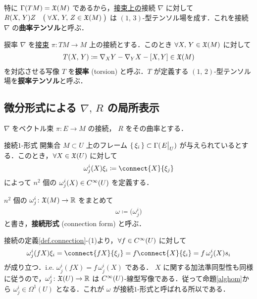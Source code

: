 \documentclass[geometry_main]{subfiles}
\begin{document}
\begin{marker} 
	特に $\Gamma(TM) = \mathfrak{X}(M)$ であるから，\underline{接束上の}接続 $\nabla$ に対して $R(X,\, Y) Z \quad \bigl(\; \forall X,\, Y,\, Z \in \mathfrak{X}(M)\; \bigr)$ は $(1,\, 3)$-型テンソル場を成す．これを接続 $\nabla$ の\textbf{曲率テンソル}と呼ぶ．
\end{marker}

\begin{mydef}[label=def.torsion]{捩率}
	$\nabla$ を\underline{接束} $ \pi \colon TM \to M$ 上の接続とする．このとき $\forall X,\, Y \in \mathfrak{X}(M)$ に対して
	\begin{align} 
		T(X,\, Y) \coloneqq \nabla_X Y - \nabla_Y X - \comm{X}{Y} \in \vecfield{M}
	\end{align}
	を対応させる写像 $T$ を\textbf{捩率} (torsion) と呼ぶ．$T$ が定義する $(1,\, 2)$-型テンソル場を\textbf{捩率テンソル}と呼ぶ．
\end{mydef}

\subsection{微分形式による $\nabla,\, R$ の局所表示}

$\nabla$ をベクトル束 $\pi \colon  E \to M$ の接続， $R$ をその曲率とする．

\begin{mydef}[label=def.form_connection]{接続$1$-形式}
	開集合 $M \subset U$ 上のフレーム $\{\, \xi_i\, \} \subset \Gamma(\eval{E}_U)$ が与えられているとする．このとき，$\forall X \in \mathfrak{X}(U)$ に対して
	\begin{align} 
		\omega^i_j(X) \xi_i \coloneqq \connect{X}{\xi_j} 
	\end{align}
	によって $n^2$ 個の $\omega^i_j(X) \in C^\infty(U)$ を定義する．
	
	$n^2$ 個の $\omega^i_j \colon \mathfrak{X}(M) \to \mathbb{R}$ をまとめて
	\begin{align} 
		\omega \coloneqq \bigl( \omega^i_j \bigr) 
	\end{align}
	と書き，\textbf{接続形式} (connection form) と呼ぶ．
\end{mydef}

接続の定義\ref{def.connection}-(1)より，$\forall f \in C^\infty(U)$ に対して
\begin{align} 
	\omega^i_j(fX) \xi_i = \connect{fX}{\xi_j} = f \connect{X}{\xi_i} = f\, \omega^i_j(X) s_i
\end{align}
が成り立つ．i.e. $\omega^i_j (fX) = f\, \omega^i_j (X)$ である．
$X$ に関する加法準同型性も同様に従うので，$\omega^i_j \colon \mathfrak{X}(U) \to \mathbb{R}$ は $C^\infty(U)$-線型写像である．従って命題\ref{alghom}から $\omega^i_j \in \Omega^1(U)$ となる．これが $\omega$ が接続$1$-形式と呼ばれる所以である．
\end{document}
